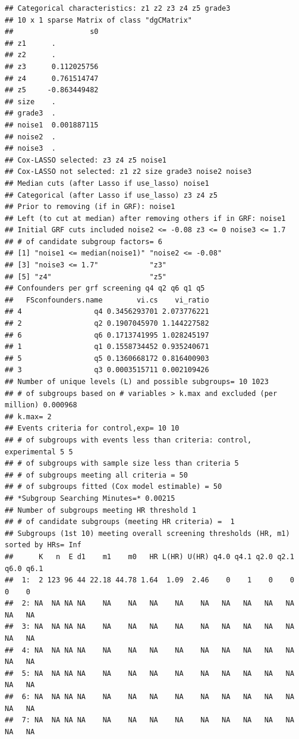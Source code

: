 \documentclass[smallextended]{svjour3}
\makeatletter
\newenvironment{kframe}{%
 \def\at@end@of@kframe{}%
 \ifinner\ifhmode%
  \def\at@end@of@kframe{\end{minipage}}%
  \begin{minipage}{\columnwidth}%
 \fi\fi%
 \def\FrameCommand##1{\hskip\@totalleftmargin \hskip-\fboxsep
 \colorbox{shadecolor}{##1}\hskip-\fboxsep
     \hskip-\linewidth \hskip-\@totalleftmargin \hskip\columnwidth}%
 \MakeFramed {\advance\hsize-\width
   \@totalleftmargin\z@ \linewidth\hsize
   \@setminipage}}%
 {\par\unskip\endMakeFramed%
 \at@end@of@kframe}
\newenvironment{knitrout}{}{} %
\makeatother
\begin{document}
\begin{knitrout}
\begin{kframe}
\begin{verbatim}
## Categorical characteristics: z1 z2 z3 z4 z5 grade3 
## 10 x 1 sparse Matrix of class "dgCMatrix"
##                  s0
## z1      .          
## z2      .          
## z3      0.112025756
## z4      0.761514747
## z5     -0.863449482
## size    .          
## grade3  .          
## noise1  0.001887115
## noise2  .          
## noise3  .          
## Cox-LASSO selected: z3 z4 z5 noise1 
## Cox-LASSO not selected: z1 z2 size grade3 noise2 noise3 
## Median cuts (after Lasso if use_lasso) noise1 
## Categorical (after Lasso if use_lasso) z3 z4 z5 
## Prior to removing (if in GRF): noise1 
## Left (to cut at median) after removing others if in GRF: noise1 
## Initial GRF cuts included noise2 <= -0.08 z3 <= 0 noise3 <= 1.7 
## # of candidate subgroup factors= 6 
## [1] "noise1 <= median(noise1)" "noise2 <= -0.08"         
## [3] "noise3 <= 1.7"            "z3"                      
## [5] "z4"                       "z5"                      
## Confounders per grf screening q4 q2 q6 q1 q5 
##   FSconfounders.name        vi.cs    vi_ratio
## 4                 q4 0.3456293701 2.073776221
## 2                 q2 0.1907045970 1.144227582
## 6                 q6 0.1713741995 1.028245197
## 1                 q1 0.1558734452 0.935240671
## 5                 q5 0.1360668172 0.816400903
## 3                 q3 0.0003515711 0.002109426
## Number of unique levels (L) and possible subgroups= 10 1023 
## # of subgroups based on # variables > k.max and excluded (per million) 0.000968 
## k.max= 2 
## Events criteria for control,exp= 10 10 
## # of subgroups with events less than criteria: control, experimental 5 5 
## # of subgroups with sample size less than criteria 5 
## # of subgroups meeting all criteria = 50 
## # of subgroups fitted (Cox model estimable) = 50 
## *Subgroup Searching Minutes=* 0.00215 
## Number of subgroups meeting HR threshold 1 
## # of candidate subgroups (meeting HR criteria) =  1 
## Subgroups (1st 10) meeting overall screening thresholds (HR, m1) sorted by HRs= Inf 
##      K   n  E d1    m1    m0   HR L(HR) U(HR) q4.0 q4.1 q2.0 q2.1 q6.0 q6.1
##  1:  2 123 96 44 22.18 44.78 1.64  1.09  2.46    0    1    0    0    0    0
##  2: NA  NA NA NA    NA    NA   NA    NA    NA   NA   NA   NA   NA   NA   NA
##  3: NA  NA NA NA    NA    NA   NA    NA    NA   NA   NA   NA   NA   NA   NA
##  4: NA  NA NA NA    NA    NA   NA    NA    NA   NA   NA   NA   NA   NA   NA
##  5: NA  NA NA NA    NA    NA   NA    NA    NA   NA   NA   NA   NA   NA   NA
##  6: NA  NA NA NA    NA    NA   NA    NA    NA   NA   NA   NA   NA   NA   NA
##  7: NA  NA NA NA    NA    NA   NA    NA    NA   NA   NA   NA   NA   NA   NA

\end{verbatim}
\end{kframe}
\end{knitrout}
\end{document}
